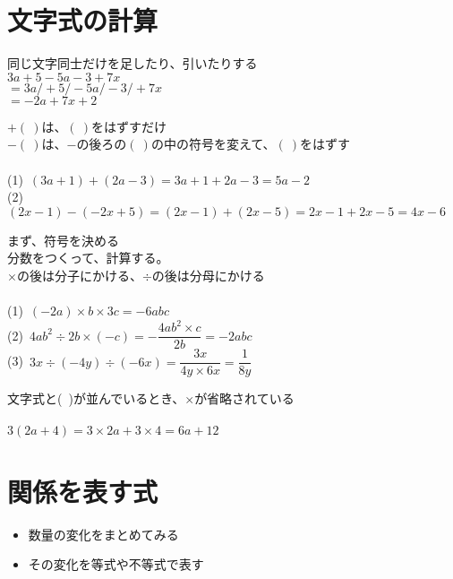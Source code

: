 \documentclass[11pt]{article}
\begin{document}
\section{文字式の計算}
\begin{tcolorbox}[mybox={文字式の加減}]
同じ文字同士だけを足したり、引いたりする\\
$3a + 5 -5a -3 +7x$\\
$= 3a /+ 5 /-5a /-3 /+7x $\\
$= -2a +7x +2$
\end{tcolorbox}

\begin{tcolorbox}[mybox={式の加減}]
$+(\ )$は、$(\ )$をはずすだけ\\
$-(\ )$は、$-$の後ろの$(\ )$の中の符号を変えて、$(\ )$をはずす\\

\\
(1)\ $(3a+1) + (2a-3) = 3a+1 + 2a-3 = 5a-2$\\
(2)\ $(2x-1) - (-2x+5) = (2x-1) + (2x-5) = 2x-1 + 2x-5 =4x -6$
\end{tcolorbox}

\begin{tcolorbox}[mybox={3つの乗除}]
まず、符号を決める\\
分数をつくって、計算する。\\
$\times$の後は分子にかける、$\div$の後は分母にかける\\

\\
(1)\ $(-2a) \times b \times 3c = -6abc$\\

(2)\ $4ab^2 \div 2 b  \times (-c) = - \dfrac{4ab^2 \times c}{2b} = -2abc$\\

(3)\ $3x \div (-4y) \div (-6x) = \dfrac{3x}{4y \times 6x} =\dfrac{1}{8y}$
\end{tcolorbox}

\begin{tcolorbox}[mybox={分配法則}]
文字式と(\ )が並んでいるとき、$\times$が省略されている\\

\\
$3(2a+4)=3 \times 2a + 3 \times 4 =6a+12$
\end{tcolorbox}


\section{関係を表す式}
\begin{tcolorbox}[mybox={関係を表す式の作り方}]
\begin{itemize}
\item 数量の変化をまとめてみる
\item その変化を等式や不等式で表す
\end{itemize}
\end{tcolorbox}
\end{document}
